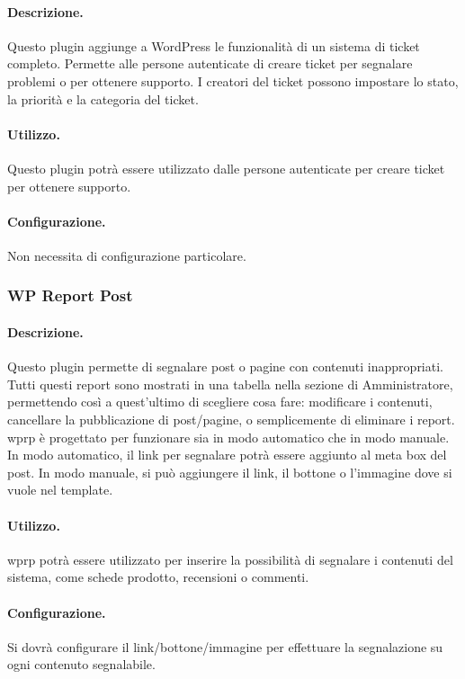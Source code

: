 \paragraph{Descrizione.} Questo plugin aggiunge a WordPress le funzionalità di un sistema di ticket completo. Permette alle persone autenticate di creare ticket per segnalare problemi o per ottenere supporto. I creatori del ticket possono impostare lo stato, la priorità e la categoria del ticket.
\paragraph{Utilizzo.} Questo plugin potrà essere utilizzato dalle persone autenticate per creare ticket per ottenere supporto.
\paragraph{Configurazione.} Non necessita di configurazione particolare.

\subsubsection{WP Report Post}
\paragraph{Descrizione.} Questo plugin permette di segnalare post o pagine con contenuti inappropriati. Tutti questi report sono mostrati in una tabella nella sezione di Amministratore, permettendo così a quest'ultimo di scegliere cosa fare: modificare i contenuti, cancellare la pubblicazione di post/pagine, o semplicemente di eliminare i report. \gls{wprp} è progettato per funzionare sia in modo automatico che in modo manuale. In modo automatico, il link per segnalare potrà essere aggiunto al meta box del post. In modo manuale, si può aggiungere il link, il bottone o l'immagine dove si vuole nel template.
\paragraph{Utilizzo.} \gls{wprp} potrà essere utilizzato per inserire la possibilità di segnalare i contenuti del sistema, come schede prodotto, recensioni o commenti.
\paragraph{Configurazione.} Si dovrà configurare il link/bottone/immagine per effettuare la segnalazione su ogni contenuto segnalabile.

